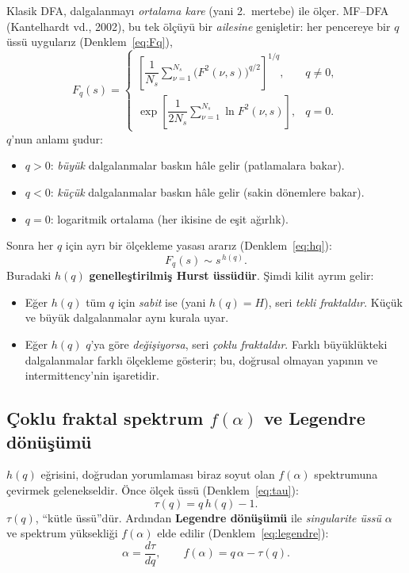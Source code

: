 \documentclass[11pt,a4paper]{article}
\begin{document}
Klasik DFA, dalgalanmayı \emph{ortalama kare} (yani 2.\ mertebe) ile ölçer.
MF--DFA (Kantelhardt vd., 2002), bu tek ölçüyü bir \emph{ailesine}
genişletir: her pencereye bir $q$ üssü uygularız
(Denklem~\eqref{eq:Fq}),
\begin{equation}
  F_q(s) =
  \begin{cases}
    \left[\dfrac{1}{N_s}\displaystyle\sum_{\nu=1}^{N_s}
      \bigl(F^2(\nu,s)\bigr)^{q/2}\right]^{1/q}, & q \neq 0,\\[2.2ex]
    \exp\!\left[\dfrac{1}{2N_s}\displaystyle\sum_{\nu=1}^{N_s}
      \ln F^2(\nu,s)\right], & q = 0.
  \end{cases}
  \label{eq:Fq}
\end{equation}
$q$'nun anlamı şudur:
\begin{itemize}[leftmargin=1.4em]
  \item $q > 0$: \emph{büyük} dalgalanmalar baskın hâle gelir (patlamalara bakar).
  \item $q < 0$: \emph{küçük} dalgalanmalar baskın hâle gelir (sakin dönemlere bakar).
  \item $q = 0$: logaritmik ortalama (her ikisine de eşit ağırlık).
\end{itemize}

Sonra her $q$ için ayrı bir ölçekleme yasası ararız
(Denklem~\eqref{eq:hq}):
\begin{equation}
  F_q(s) \sim s^{\,h(q)}.
  \label{eq:hq}
\end{equation}
Buradaki $h(q)$ \textbf{genelleştirilmiş Hurst üssüdür}. Şimdi kilit ayrım
gelir:
\begin{itemize}[leftmargin=1.4em]
  \item Eğer $h(q)$ tüm $q$ için \emph{sabit} ise (yani $h(q)=H$), seri
        \emph{tekli fraktaldır}. Küçük ve büyük dalgalanmalar aynı kurala uyar.
  \item Eğer $h(q)$ $q$'ya göre \emph{değişiyorsa}, seri \emph{çoklu
        fraktaldır}. Farklı büyüklükteki dalgalanmalar farklı ölçekleme
        gösterir; bu, doğrusal olmayan yapının ve intermittency'nin işaretidir.
\end{itemize}

\subsection{Çoklu fraktal spektrum $f(\alpha)$ ve Legendre dönüşümü}

$h(q)$ eğrisini, doğrudan yorumlaması biraz soyut olan $f(\alpha)$
spektrumuna çevirmek gelenekseldir. Önce ölçek üssü
(Denklem~\eqref{eq:tau}):
\begin{equation}
  \tau(q) = q\,h(q) - 1 .
  \label{eq:tau}
\end{equation}
$\tau(q)$, ``kütle üssü''dür. Ardından \textbf{Legendre dönüşümü} ile
\emph{singularite üssü} $\alpha$ ve spektrum yüksekliği $f(\alpha)$ elde edilir
(Denklem~\eqref{eq:legendre}):
\begin{equation}
  \alpha = \frac{d\tau}{dq}, \qquad f(\alpha) = q\,\alpha - \tau(q).
  \label{eq:legendre}
\end{equation}
\end{document}
